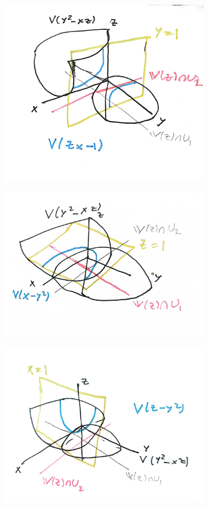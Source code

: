 \documentclass[a4paper]{article}
\begin{document}
   \begin{figure}[H]
       \centering
       \includegraphics[width=0.8\textwidth]{3c2.jpeg}
       \label{fig:3c2-jpeg}
   \end{figure}
   \begin{figure}[H]
       \centering
       \includegraphics[width=0.8\textwidth]{3c3.jpeg}
       \label{fig:3c3-jpeg}
   \end{figure}
   \begin{figure}[H]
       \centering
       \includegraphics[width=0.8\textwidth]{3c4.jpeg}
       \label{fig:3c4-jpeg}
   \end{figure}
   
\end{document}

